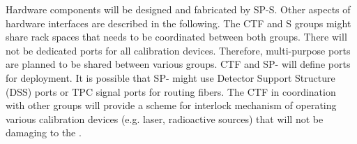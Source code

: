 Hardware components will be designed and fabricated by SP-S. Other aspects of hardware interfaces are described in the following. The CTF and S groups might share rack spaces that needs to be coordinated between both groups. There will not be dedicated ports for all calibration devices. Therefore, multi-purpose ports are planned to be shared between various groups. CTF and SP- will define ports for deployment. It is possible that SP- might use Detector Support Structure (DSS) ports or TPC signal ports for routing fibers. The CTF in coordination with other groups will provide a scheme for interlock mechanism of operating various calibration devices (e.g. laser, radioactive sources) that will not be damaging to the . 








